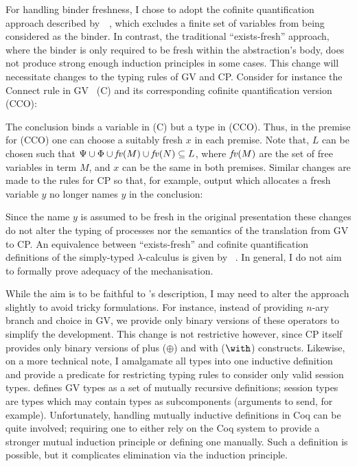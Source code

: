 \documentclass{mprop}
\begin{document}
For handling binder freshness, I chose to adopt the cofinite quantification
approach described by~\cite{Aydemir:2008:EFM}~\cite{Aydemir:2008:EFM}, which
excludes a finite set of variables from being considered as the binder. In
contrast, the traditional ``exists-fresh'' approach, where the binder is only
required to be fresh within the abstraction's body, does not produce strong
enough induction principles in some cases. This change will necessitate
changes to the typing rules of GV and CP. Consider for instance the Connect
rule in GV~\cite{Wadler:2014} (C) and its corresponding cofinite
quantification version (CCO):


The conclusion binds a variable in (C) but a type in (CCO). Thus, in the
premise for (CCO) one can choose a suitably fresh $x$ in each premise. Note
that, $L$ can be chosen such that $\Psi \cup \Phi \cup \mathit{fv}(M) \cup \mathit{fv}(N)
\subseteq L$, where $\mathit{fv}(M)$ are the set of free variables in term $M$, and
$x$ can be the same in both premises. Similar changes are made to the rules
for CP so that, for example, output which allocates a fresh variable $y$ no
longer names $y$ in the conclusion: 

Since the name $y$ is assumed to be fresh in the original presentation these
changes do not alter the typing of processes nor the semantics of the
translation from GV to CP. An equivalence between ``exists-fresh'' and
cofinite quantification definitions of the simply-typed $\lambda$-calculus is
given by \citeauthor{Aydemir:2008:EFM}~\cite{Aydemir:2008:EFM}. In general, I
do not aim to formally prove adequacy of the mechanisation.

While the aim is to be faithful to \citeauthor{Wadler:2014}'s description, I
may need to alter the approach slightly to avoid tricky formulations. For
instance, instead of providing $n$-ary branch and choice in GV, we provide
only binary versions of these operators to simplify the development. This
change is not restrictive however, since CP itself provides only binary
versions of plus ($\oplus$) and with ($\with$) constructs. Likewise, on a more
technical note, I amalgamate all types into one inductive definition and
provide a predicate for restricting typing rules to consider only valid
session types. \citeauthor{Wadler:2014} defines GV types as a set of mutually
recursive definitions; session types are types which may contain types as
subcomponents (arguments to send, for example). Unfortunately, handling
mutually inductive definitions in Coq can be quite involved; requiring one to
either rely on the Coq system to provide a stronger mutual induction principle
or defining one manually. Such a definition is possible, but it complicates
elimination via the induction principle.
\end{document}
